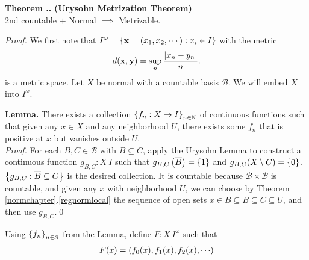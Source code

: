 \documentclass{natsirt}
\newcommand{\scr}{\mathscr}
\newcommand{\ol}{\overline}
\newcounter{def}[section]
\newcounter{thm}[section]
\newenvironment{thmbox}[1][]{
\begin{greenbox}[#1]\refstepcounter{thm}\textbf{Theorem \thesection.\thethm. }}{\end{greenbox}}
\begin{document}
\begin{thmbox}
    \textbf{(Urysohn Metrization Theorem)}\\
    2nd countable $+$ Normal $\implies$ Metrizable.
\end{thmbox}
\textit{Proof.} We first note that $I^\omega = \left\{ \textbf{x}= (x_1,x_2,\cdots) : x_i \in I \right\}$ with the metric
\begin{align*}
    d(\textbf{x},\textbf{y}) = \sup_n \frac{\left| x_n-y_n\right|}{n}.
\end{align*}
is a metric space. Let $X$ be normal with a countable basis $\scr{B}$. We will embed $X$ into $I^\omega$. 
\begin{whitebox}
    \textbf{Lemma.} There exists a collection $\left\{ f_n: X\rightarrow I \right\}_{n\in\mathbb{N}}$ of continuous functions such that given any $x\in X$ and any neighborhood $U$, there exists some $f_n$ that is positive at $x$ but vanishes outside $U$.\vspace{5pt}\\
    \textit{Proof.} For each $B,C\in \scr{B}$ with $\ol{B}\subseteq C$, apply the Urysohn Lemma to construct a continuous function $g_{B,C}:X\>I$ such that $g_{B,C}\pr{\ol{B}} = \set{1}$ and $g_{B,C}(X\setminus C) = \left\{ 0 \right\}$. $\set{g_{B,C}: \ol{B}\subseteq C}$ is the desired collection. It is countable because $\scr{B}\times \scr{B}$ is countable, and given any $x$ with neighborhood $U$, we can choose by Theorem \ref{normchapter}.\ref{regnormlocal} the sequence of open sets $x\in B \subseteq \ol{B} \subseteq C \subseteq U$, and then use $g_{B,C}$.\qed
\end{whitebox}
Using $\left\{ f_n \right\}_{n\in\mathbb{N}}$ from the Lemma, define $F:X\> I^\omega$ such that
\begin{align*}
    F(x) = \pr{f_0(x), f_1(x), f_2(x), \cdots}
\end{align*}
\end{document}
